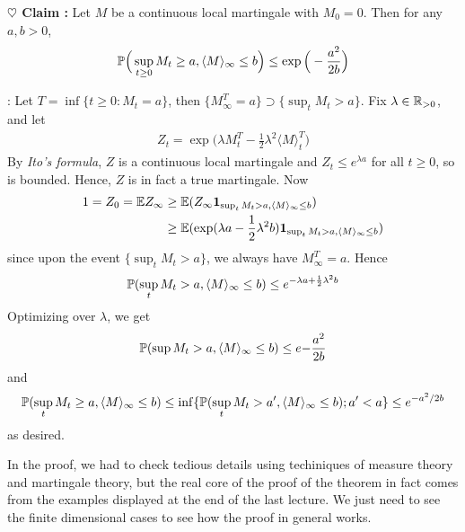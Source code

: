\documentclass[12pt,a4paper]{article}
\newenvironment{proof}
{\begin{changemargin}{0.5cm}{0.5cm} 
	}%
	{\end{changemargin}
}
\newenvironment{subproof}
{\begin{changemargin}{0.5cm}{0.5cm} 
	}%
	{\end{changemargin}
}
\newenvironment{p}
{\begin{proof} 
	}%
	{\end{proof}
}
\begin{document}
\begin{p}
\textbf{$\heartsuit$ Claim :} Let $M$ be a continuous local martingale with $M_0 =0$. Then for any $a,b>0$,
\begin{align*}
\mathbb{P}\Big( \sup_{t\geq 0} M_t \geq a, \langle M\rangle_{\infty} \leq b\Big) \leq \exp \Big( -\frac{a^2}{2b} \Big)
\end{align*}
\begin{subproof}
: Let $T=\inf \{t\geq 0 : M_t =a \}$, then $\{M_{\infty}^{T} =a \} \supset \{ \sup_t M_t >a\}$. Fix $\lambda \in \mathbb{R}_{>0}$, and let
\begin{align*}
Z_t = \exp \Big( \lambda M_t^T -\frac{1}{2} \lambda^2 \langle M \rangle_t^T \Big)
\end{align*}
By \emph{Ito's formula}, $Z$ is a continuous local martingale and $Z_t \leq e^{\lambda a}$ for all $t\geq 0$, so is bounded. Hence, $Z$ is in fact a true martingale. Now
\begin{align*}
1 = Z_0 = \mathbb{E} Z_{\infty} &\geq \mathbb{E}(Z_{\infty} \bm{1}_{\sup_{t} M_t >a, \langle M \rangle_{\infty} \leq b}) \\
&\geq \mathbb{E} (\exp (\lambda a -\frac{1}{2} \lambda^2 b) \bm{1}_{\sup_{t} M_t >a, \langle M \rangle_{\infty} \leq b})
\end{align*}
since upon the event $\{\sup_{t} M_t >a\}$, we always have $M_{\infty}^T =a$. Hence
\begin{align*}
\mathbb{P} (\sup_t M_t >a, \langle M \rangle_{\infty} \leq b) \leq e^{-\lambda a + \frac{1}{2} \lambda^2 b}
\end{align*} 
Optimizing over $\lambda$, we get
\begin{align*}
\mathbb{P} (\sup M_t >a, \langle M \rangle_{\infty} \leq b) \leq e{-\frac{a^2}{2b}}
\end{align*}
and
\begin{align*}
\mathbb{P}(\sup_t M_t \geq a, \langle M \rangle_{\infty} \leq b) \leq \inf \{ \mathbb{P}(\sup_t M_t >a', \langle M\rangle_{\infty} \leq b) ; a'<a \} \leq e^{-a^2 /2b}
\end{align*}
as desired.
\end{subproof}
\eop 
\end{p}
\s

In the proof, we had to check tedious details using techiniques of measure theory and martingale theory, but the real core of the proof of the theorem in fact comes from the examples displayed at the end of the last lecture. We just need to see the finite dimensional cases to see how the proof in general works. 
\s

\newday
\end{document}
